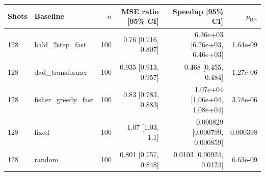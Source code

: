 \begin{tabular}{llrrrr}
\toprule
Shots & Baseline & $n$ & MSE ratio [95\% CI] & Speedup [95\% CI] & $p_{\mathrm{BH}}$ \\
\midrule
128 & bald\_2step\_fast & 100 & 0.76 [0.716, 0.807] & 6.36e+03 [6.26e+03, 6.46e+03] & 1.64e-09 \\
128 & dad\_transformer & 100 & 0.935 [0.913, 0.957] & 0.468 [0.455, 0.484] & 1.27e-06 \\
128 & fisher\_greedy\_fast & 100 & 0.83 [0.783, 0.883] & 1.07e+04 [1.06e+04, 1.08e+04] & 3.78e-06 \\
128 & fixed & 100 & 1.07 [1.03, 1.1] & 0.000829 [0.000799, 0.000859] & 0.000398 \\
128 & random & 100 & 0.801 [0.757, 0.848] & 0.0103 [0.00924, 0.0124] & 6.63e-09 \\
\bottomrule
\end{tabular}
